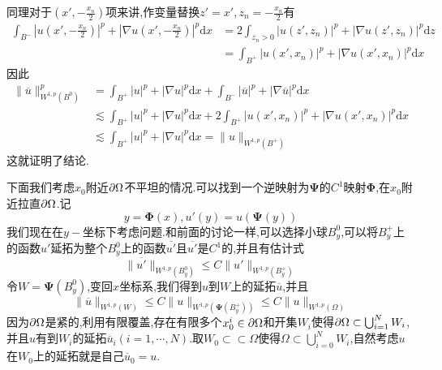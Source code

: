 同理对于$(x',-\frac{x_n}{2})$项来讲,作变量替换$z'=x',z_n=-\frac{x_n}{2}$有
$$
\begin{aligned}
    \int_{B^-}|u(x',-\frac{x_n}{2})|^p+|\nabla u(x',-\frac{x_n}{2})|^p\mathrm{d}x &=2\int_{z_n>0}|u(z',z_n)|^p+|\nabla u(z',z_n)|^p\mathrm{d}z\\
                                                                                  &=\int_{B^+}|u(x',x_n)|^p+|\nabla u(x',x_n)|^p\mathrm{d}x
\end{aligned}
$$
因此
$$
\begin{aligned}
    \|\overline{u}\|_{W^{1,p}(B^0)}^p &= \int_{B^+}|u|^p+|\nabla u|^p\mathrm{d}x+\int_{B^-}|\overline{u}|^p+|\nabla \overline{u}|^p\mathrm{d}x\\
                                      & \lesssim \int_{B^+}|u|^p+|\nabla u|^p\mathrm{d}x+2\int_{B^+}|u(x',x_n)|^p+|\nabla u(x',x_n)|^p\mathrm{d}x\\
                                      & \lesssim \int_{B^+}|u|^p+|\nabla u|^p\mathrm{d}x=\|u\|_{W^{1,p}(B^+)}
\end{aligned}
$$
这就证明了结论.\par
下面我们考虑$x_0$附近$\partial\Omega$不平坦的情况.可以找到一个逆映射为$\boldsymbol{\Psi }$的$C^1$映射$\boldsymbol{\Phi} $,在$x_0$附近拉直$\partial\Omega$.记
$$
y=\boldsymbol{\Phi}(x),u'(y)=u(\boldsymbol{\Psi}(y))
$$
我们现在在$y-$坐标下考虑问题.和前面的讨论一样,可以选择小球$B^0_y$,可以将$B^+_y$上的函数$u'$延拓为整个$B^0_y$上的函数$\overline{u'}$且$\overline{u'}$是$C^1$的,并且有估计式
$$
\|\overline{u'}\|_{W^{1,p}(B^0_y)}\leqslant C\|u'\|_{W^{1,p}(B^+_y)}
$$
令$W=\boldsymbol{\Psi}(B^0_y)$,变回$x$坐标系,我们得到$u$到$W$上的延拓$\overline{u}$,并且
$$
\|\overline{u}\|_{W^{1,p}(W)}\leqslant C\|u\|_{W^{1,p}(\boldsymbol{\Psi}(B^+_y))}\leqslant C\|u\|_{W^{1,p}(\Omega)}
$$
因为$\partial\Omega$是紧的,利用有限覆盖,存在有限多个$x_0^i\in\partial\Omega$和开集$W_i$使得$\partial\Omega\subset\bigcup^{N}_{i=1}W_i$,并且$u$有到$W_i$的延拓$\overline{u}_i(i=1,\cdots,N)$.取$W_0\subset\subset \Omega$使得$\Omega\subset\bigcup^{N}_{i=0}W_i$,自然考虑$u$在$W_0$上的延拓就是自己$\overline{u}_0=u$.\par
